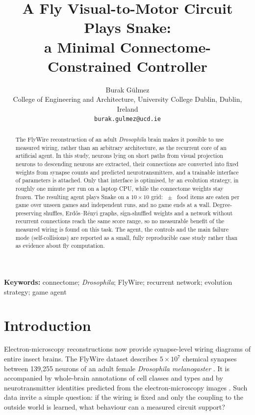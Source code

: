 \documentclass[11pt]{article}
\title{\textbf{A Fly Visual-to-Motor Circuit Plays Snake:\\a Minimal Connectome-Constrained Controller}}
\author{Burak G\"ulmez\\[2pt]
\small College of Engineering and Architecture, University College Dublin, Dublin, Ireland\\
\small \texttt{burak.gulmez@ucd.ie}}
\date{}
\begin{document}
\maketitle

\begin{abstract}
\noindent
The FlyWire reconstruction of an adult \textit{Drosophila} brain makes it possible to use measured
wiring, rather than an arbitrary architecture, as the recurrent core of an artificial agent. In this
study, \Neurons{} neurons lying on short paths from visual projection neurons to descending neurons
are extracted, their \Edges{} connections are converted into fixed weights from synapse counts and
predicted neurotransmitters, and a trainable interface of \NParams{} parameters is attached. Only
that interface is optimised, by an evolution strategy, in roughly one minute per run on a laptop
CPU, while the connectome weights stay frozen. The resulting agent plays Snake on a $10\times10$
grid: \ConnMean{}~$\pm$~\ConnSd{} food items are eaten per game over \TestGames{} unseen games and
\NSeeds{} independent runs, and no game ends at a wall. Degree-preserving shuffles,
Erd\H{o}s--R\'enyi graphs, sign-shuffled weights and a network without recurrent connections reach
the same score range, so no measurable benefit of the measured wiring is found on this task. The
agent, the controls and the main failure mode (self-collisions) are reported as a small, fully
reproducible case study rather than as evidence about fly computation.
\end{abstract}

\textbf{Keywords:} connectome; \textit{Drosophila}; FlyWire; recurrent network; evolution strategy; game agent

\section{Introduction}
Electron-microscopy reconstructions now provide synapse-level wiring diagrams of entire insect
brains. The FlyWire dataset describes $5\times10^{7}$ chemical synapses between 139{,}255 neurons of
an adult female \textit{Drosophila melanogaster} \cite{dorkenwald2024}. It is accompanied by
whole-brain annotations of cell classes and types \cite{schlegel2024} and by neurotransmitter
identities predicted from the electron-microscopy images \cite{eckstein2024}. Such data invite a
simple question: if the wiring is fixed and only the coupling to the outside world is learned, what
behaviour can a measured circuit support?
\end{document}
